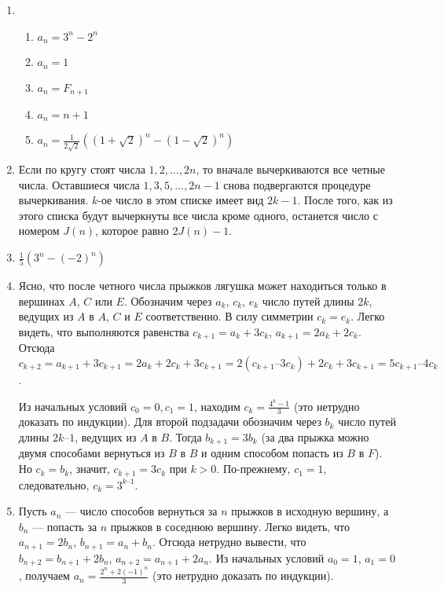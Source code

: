 \documentclass[14pt,openany]{book}
\begin{document}
\begin{enumerate}
\item 
  \begin{enumerate}
    \item $a_n = 3^n - 2^n$
    \item $a_n = 1$
    \item $a_n = F_{n+1}$
    \item $a_n = n + 1$
    \item $a_n = \frac{1}{2\sqrt{2}}\left(\left(1+\sqrt{2}\right)^n - \left(1-\sqrt{2}\right)^n\right)$
  \end{enumerate}

\item Если по кругу стоят числа $1, 2, \ldots, 2n$, то вначале вычеркиваются все четные числа. Оставшиеся числа $1, 3, 5, \ldots, 2n - 1$ снова подвергаются процедуре вычеркивания. $k$-ое число в этом списке имеет вид $2k - 1$. После того, как из этого списка будут вычеркнуты все числа кроме одного, останется число с номером $J(n)$, которое равно $2J(n) - 1$. 

\item $\frac{1}{5}(3^n-(-2)^n)$

\item Ясно, что после четного числа прыжков лягушка может находиться только в вершинах $A$, $C$ или $E$. Обозначим через $a_k$, $c_k$, $e_k$ число путей длины $2k$, ведущих из $A$ в $A$, $C$ и $E$ соответственно. В силу симметрии  $c_k = e_k$.  Легко видеть, что выполняются равенства
      $c_{k+1} = a_k + 3c_k$, $a_{k+1} = 2a_k + 2c_k$.
   Отсюда
      $c_{k+2} = a_{k+1} + 3c_{k+1} = 2a_k + 2c_k + 3c_{k+1} = 2(c_{k+1} – 3c_k) + 2c_k + 3c_{k+1} = 5c_{k+1} – 4c_k$.

   Из начальных условий $c_0 = 0,  c_1 = 1$,   находим $c_k = \frac{4^k - 1}{3}$ (это нетрудно доказать по индукции).
   Для второй подзадачи обозначим через $b_k$ число путей длины  $2k – 1$,  ведущих из $A$ в $B$. Тогда   $b_{k+1} = 3b_k$  (за два прыжка можно двумя способами вернуться из $B$ в $B$ и одним способом попасть из $B$ в $F$). Но $c_k = b_k$,   значит,
$c_{k+1} = 3c_k$  при  $k > 0$.  По-прежнему,  $c_1 = 1$,  следовательно, $c_k = 3^{k–1}$.

\item    Пусть $a_n$ --– число способов вернуться за $n$ прыжков в исходную вершину, а $b_n$ --– попасть за $n$ прыжков в соседнюю вершину.
Легко видеть, что   $a_{n+1} = 2b_n$,  $b_{n+1} = a_n + b_n$.   Отсюда нетрудно вывести, что   $b_{n+2} = b_{n+1} + 2b_n$,  $a_{n+2} = a_{n+1} + 2a_n$.
   Из начальных условий $a_0 = 1$, $a_1 = 0$,   получаем $a_n = \frac{2^n + 2(-1)^n}{3}$ (это нетрудно доказать по индукции).


\end{enumerate}
\end{document}
